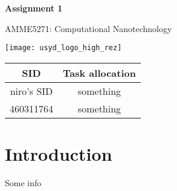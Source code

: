 \documentclass[11pt]{article}
\begin{document}


\begin{titlepage}
	\begin{center}
		\vspace*{1cm}

		\Huge
		\textbf{Assignment 1}

		\vspace{0.5cm}
		\LARGE
		AMME5271: Computational Nanotechnology

		\vfill

		\texttt{[image: usyd\_logo\_high\_rez]}

		\vfill

		\begin{table}[H]
			\centering
			\Large
			\begin{tabular}{@{}cc@{}}
				\toprule
				SID & Task allocation \\
				\midrule
				niro's SID & something \\
				460311764 & something\\
				\bottomrule
			\end{tabular}
		\end{table}
	\end{center}
\end{titlepage}
\newpage

\clearpage
\thispagestyle{empty}
\tableofcontents
\listoftables
\listoffigures

\clearpage
{}

\section{Introduction}
Some info
\end{document}
